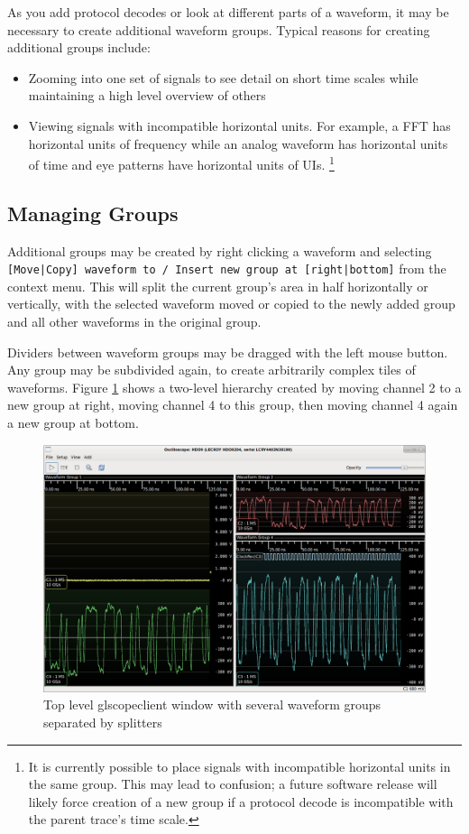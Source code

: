 \documentclass[11pt]{article}
\newcommand{\menustyle}[1]{\texttt{#1}}
\begin{document}
As you add protocol decodes or look at different parts of a waveform, it may be necessary to create additional waveform
groups. Typical reasons for creating additional groups include:

\begin{itemize}
\item Zooming into one set of signals to see detail on short time scales while maintaining a high level overview of
others
\item Viewing signals with incompatible horizontal units. For example, a FFT has horizontal units of frequency while an
analog waveform has horizontal units of time and eye patterns have horizontal units of UIs.
\footnote
{
It is currently possible to place signals with incompatible horizontal units in the same group. This may lead to
confusion; a future software release will likely force creation of a new group if a protocol decode is incompatible
with the parent trace's time scale.
}
\end{itemize}

\subsection{Managing Groups}

Additional groups may be created by right clicking a waveform and selecting \menustyle{[Move|Copy] waveform to / Insert
new group at [right|bottom]} from the context menu. This will split the current group's area in half horizontally or
vertically, with the selected waveform moved or copied to the newly added group and all other waveforms in the original
group.

Dividers between waveform groups may be dragged with the left mouse button. Any group may be subdivided again, to
create arbitrarily complex tiles of waveforms. Figure \ref{multiple-groups} shows a two-level hierarchy created by
moving channel 2 to a new group at right, moving channel 4 to this group, then moving channel 4 again a new group at
bottom.

\begin{figure}[h]
\centering
\includegraphics[width=14cm]{images/multiple-groups.png}
\caption{Top level glscopeclient window with several waveform groups separated by splitters}
\label{multiple-groups}
\end{figure}
\end{document}
